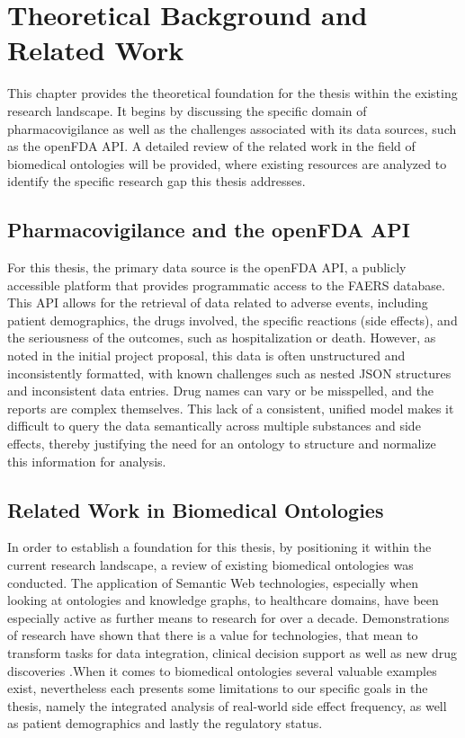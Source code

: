 \section{Theoretical Background and Related Work}
This chapter provides the theoretical foundation for the thesis within the existing research landscape. It begins by discussing the specific domain of pharmacovigilance as well as the challenges associated with its data sources, such as the openFDA API. A detailed review of the related work in the field of biomedical ontologies will be provided, where existing resources are analyzed to identify the specific research gap this thesis addresses.
\subsection{Pharmacovigilance and the openFDA API}
 For this thesis, the primary data source is the openFDA API, a publicly accessible platform that provides programmatic access to the FAERS database. This API allows for the retrieval of data related to adverse events, including patient demographics, the drugs involved, the specific reactions (side effects), and the seriousness of the outcomes, such as hospitalization or death. However, as noted in the initial project proposal, this data is often unstructured and inconsistently formatted, with known challenges such as nested JSON structures and inconsistent data entries. Drug names can vary or be misspelled, and the reports are complex themselves. This lack of a consistent, unified model makes it difficult to query the data semantically across multiple substances and side effects, thereby justifying the need for an ontology to structure and normalize this information for analysis.
\subsection{Related Work in Biomedical Ontologies}
In order to establish a foundation for this thesis, by positioning it within the current research landscape, a review of existing biomedical ontologies was conducted.  The application of Semantic Web technologies, especially when looking at ontologies and knowledge graphs, to healthcare domains, have been especially active as further means to research for over a decade. Demonstrations of research have shown that there is a value for technologies, that mean to transform tasks for data integration, clinical decision support as well as new drug discoveries \cite{Daconta2003semanticWeb}.When it comes to biomedical ontologies several valuable examples exist, nevertheless each presents some limitations to our specific goals in the thesis, namely the integrated analysis of real-world side effect frequency, as well as patient demographics and lastly the regulatory status. 
